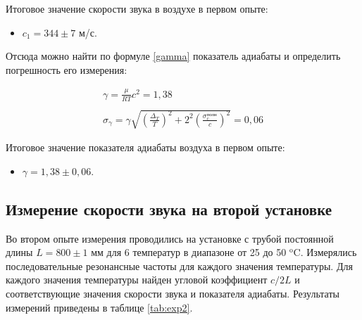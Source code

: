 \documentclass[a4paper,12pt]{article} %
\begin{document}
Итоговое значение скорости звука в воздухе в первом опыте:

\begin{itemize}
    \item $c_1 = 344 \pm 7$ м/с. 
\end{itemize}

Отсюда можно найти по формуле \eqref{gamma} показатель адиабаты и определить погрешность его измерения:

\begin{equation*}
\begin{array}{c}
    \gamma = \frac{\mu}{RT}c^2 = 1,38 \\
     \\
    \sigma_\gamma = \gamma\sqrt{(\frac{\Delta_T}{T})^2 + 2^2(\frac{\sigma_c^\text{полн}}{c})^2} = 0,06 
\end{array}
\end{equation*}

Итоговое значение показателя адиабаты воздуха в первом опыте:

\begin{itemize}
    \item $\gamma = 1,38 \pm 0,06$. 
\end{itemize}

\subsection{Измерение скорости звука на второй установке}

Во втором опыте измерения проводились на установке с трубой постоянной длины $L = 800 \pm 1$ мм для 6 температур в диапазоне от 25 до 50 $^\text{o}$C. Измерялись последовательные резонансные частоты для каждого значения температуры. Для каждого значения температуры найден угловой коэффициент $c/2L$ и соответствующие значения скорости звука и показателя адиабаты. Результаты измерений приведены в таблице \ref{tab:exp2}.
\end{document}

